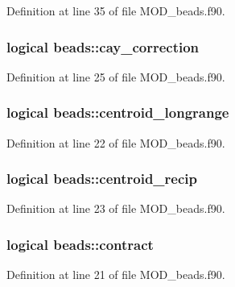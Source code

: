 Definition at line 35 of file M\-O\-D\-\_\-beads.\-f90.

\hypertarget{classbeads_a08ceabf65355ea75dacc54a1cc1613bb}{
\subsubsection[{cay\-\_\-correction}]{\setlength{\rightskip}{0pt plus 5cm}logical beads\-::cay\-\_\-correction}}\label{classbeads_a08ceabf65355ea75dacc54a1cc1613bb}


Definition at line 25 of file M\-O\-D\-\_\-beads.\-f90.

\hypertarget{classbeads_a93834d2ff15b4fb83ec6772666a2f521}{
\subsubsection[{centroid\-\_\-longrange}]{\setlength{\rightskip}{0pt plus 5cm}logical beads\-::centroid\-\_\-longrange}}\label{classbeads_a93834d2ff15b4fb83ec6772666a2f521}


Definition at line 22 of file M\-O\-D\-\_\-beads.\-f90.

\hypertarget{classbeads_a51794c51cf3c21074decc3ba51ee435c}{
\subsubsection[{centroid\-\_\-recip}]{\setlength{\rightskip}{0pt plus 5cm}logical beads\-::centroid\-\_\-recip}}\label{classbeads_a51794c51cf3c21074decc3ba51ee435c}


Definition at line 23 of file M\-O\-D\-\_\-beads.\-f90.

\hypertarget{classbeads_afcca94caf03fb392889db93cd120504f}{
\subsubsection[{contract}]{\setlength{\rightskip}{0pt plus 5cm}logical beads\-::contract}}\label{classbeads_afcca94caf03fb392889db93cd120504f}


Definition at line 21 of file M\-O\-D\-\_\-beads.\-f90.


